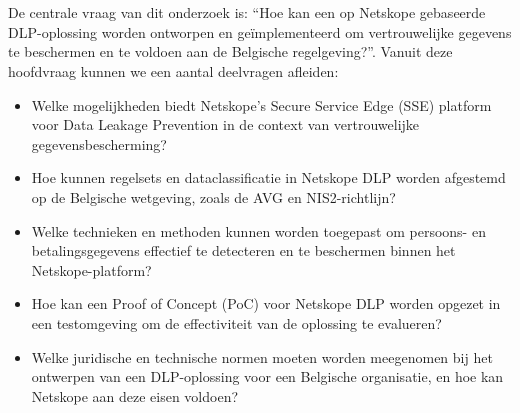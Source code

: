

\section{}%
\label{sec:onderzoeksvraag}

De centrale vraag van dit onderzoek is: “Hoe kan een op Netskope gebaseerde DLP-oplossing worden ontworpen en geïmplementeerd om vertrouwelijke gegevens te beschermen en te voldoen aan de Belgische regelgeving?”. 
Vanuit deze hoofdvraag kunnen we een aantal deelvragen afleiden:

\begin{itemize}
    \item Welke mogelijkheden biedt Netskope's Secure Service Edge (SSE) platform voor Data Leakage Prevention in de context van vertrouwelijke gegevensbescherming?
    \item Hoe kunnen regelsets en dataclassificatie in Netskope DLP worden afgestemd op de Belgische wetgeving, zoals de AVG en NIS2-richt\-lijn?
    \item Welke technieken en methoden kunnen worden toegepast om persoons- en betalingsgegevens effectief te detecteren en te beschermen binnen het Net\-skope-platform?
    \item Hoe kan een Proof of Concept (PoC) voor Netskope DLP worden opgezet in een testomgeving om de effectiviteit van de oplossing te evalueren?
    \item Welke juridische en technische normen moeten worden meegenomen bij het ontwerpen van een DLP-oplossing voor een Belgische organisatie, en hoe kan Netskope aan deze eisen voldoen?
\end{itemize}


